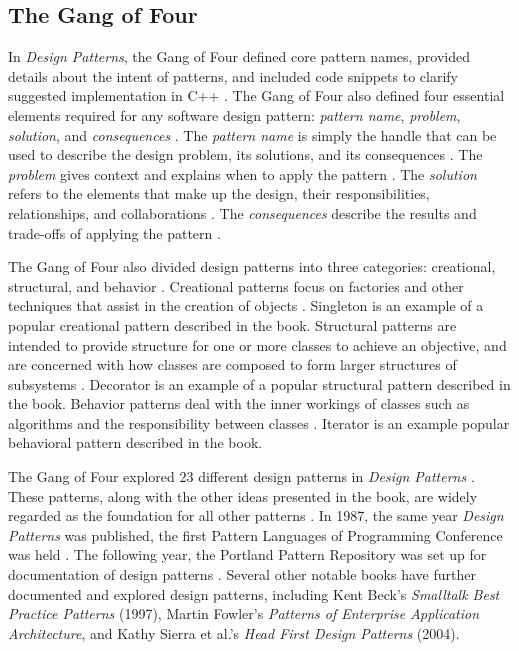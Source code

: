\documentclass[11pt]{article}
\begin{document}
\subsection{The Gang of Four}


In \textit{Design Patterns}, the Gang of Four defined core pattern names, provided details about the intent of patterns, and included code snippets to clarify suggested implementation in C++ \cite{gamma1995}. The Gang of Four also defined four essential elements required for any software design pattern: \textit{pattern name}, \textit{problem}, \textit{solution}, and \textit{consequences} \cite{gamma1995}. The \textit{pattern name} is simply the handle that can be used to describe the design problem, its solutions, and its consequences \cite{gamma1995}. The \textit{problem} gives context and explains when to apply the pattern \cite{gamma1995}. The \textit{solution} refers to the elements that make up the design, their responsibilities, relationships, and collaborations \cite{gamma1995}. The \textit{consequences} describe the results and trade-offs of applying the pattern \cite{gamma1995}. 

The Gang of Four also divided design patterns into three categories: creational, structural, and behavior \cite{gamma1995}. Creational patterns focus on factories and other techniques that assist in the creation of objects \cite{gamma1995}. Singleton is an example of a popular creational pattern described in the book. Structural patterns are intended to provide structure for one or more classes to achieve an objective, and are concerned with how classes are composed to form larger structures of subsystems \cite{gamma1995}. Decorator is an example of a popular structural pattern described in the book. Behavior patterns deal with the inner workings of classes such as algorithms and the responsibility between classes \cite{gamma1995}. Iterator is an example popular behavioral pattern described in the book. 
	
	The Gang of Four explored 23 different design patterns in \textit{Design Patterns} \cite{gamma1995}. These patterns, along with the other ideas presented in the book, are widely regarded as the foundation for all other patterns \cite{clarke2016}. In 1987, the same year \textit{Design Patterns} was published, the first Pattern Languages of Programming Conference was held \cite{cunningham2011}. The following year, the Portland Pattern Repository was set up for documentation of design patterns \cite{cunningham2011}. Several other notable books have further documented and explored design patterns, including Kent Beck's \textit{Smalltalk Best Practice Patterns} (1997), Martin Fowler's \textit{Patterns of Enterprise Application Architecture}, and Kathy Sierra et al.'s \textit{Head First Design Patterns} (2004).
\end{document}
